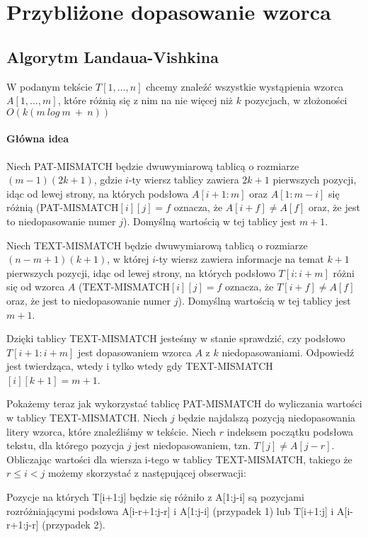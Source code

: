 \section{Przybliżone dopasowanie wzorca}

\subsection{Algorytm Landaua-Vishkina}
W podanym tekście $T[1,\dots,n]$ chcemy znaleźć wszystkie wystąpienia wzorca $A[1,\dots,m]$, które różnią się z nim na nie więcej niż $k$ pozycjach, w złożoności $O(k(m\ log\ m \ + \ n))$

\paragraph{Główna idea}
Niech PAT-MISMATCH będzie dwuwymiarową tablicą o rozmiarze $(m-1)(2k+1)$, gdzie 
$i$-ty wiersz tablicy zawiera $2k+1$ pierwszych pozycji, idąc od lewej strony, na których podsłowa $A[i+1:m]$ oraz $A[1:m-i]$ się różnią (PAT-MISMATCH$[i][j] = f$ oznacza, że $A[i+f] \neq A[f]$ oraz, że jest to niedopasowanie numer $j$). 
Domyślną wartością w tej tablicy jest $m+1$.

Niech TEXT-MISMATCH będzie dwuwymiarową tablicą o rozmiarze $(n-m+1)(k+1)$, w której $i$-ty wiersz zawiera informacje na temat $k+1$ pierwszych pozycji, idąc od lewej strony, na których podsłowo $T[i:i+m]$ różni się od wzorca $A$ (TEXT-MISMATCH$[i][j] = f$ oznacza, że $T[i+f] \neq A[f]$ oraz, że jest to niedopasowanie numer $j$). 
Domyślną wartością w tej tablicy jest $m+1$.

Dzięki tablicy TEXT-MISMATCH jesteśmy w stanie sprawdzić, czy podsłowo $T[i+1:i+m]$ jest dopasowaniem wzorca $A$ z $k$ niedopasowaniami.
Odpowiedź jest twierdząca, wtedy i tylko wtedy gdy TEXT-MISMATCH$[i][k+1] = m+1$. 

Pokażemy teraz jak wykorzystać tablicę PAT-MISMATCH do wyliczania wartości w tablicy TEXT-MISMATCH.
Niech $j$ będzie najdalszą pozycją niedopasowania litery wzorca, które znaleźliśmy w tekście.
Niech $r$ indeksem początku podsłowa tekstu, dla którego pozycja $j$ jest niedopasowaniem, tzn. $T[j] \neq A[j-r]$.
Obliczając wartości dla wiersza i-tego w tablicy TEXT-MISMATCH, takiego że $r\leq i < j$ możemy skorzystać z następującej obserwacji:
\begin{lemma}{}{}
\label{obs_1}
Pozycje na których T[i+1:j] będzie się różniło z A[1:j-i] są pozycjami rozróżniającymi podsłowa A[i-r+1:j-r] i A[1:j-i] (przypadek 1) lub T[i+1:j] i A[i-r+1:j-r] (przypadek 2). 
\end{lemma}

